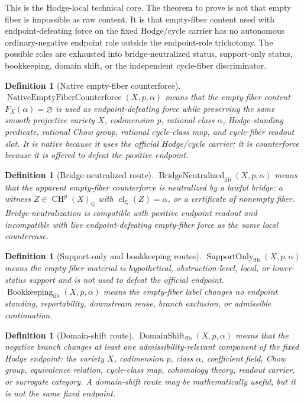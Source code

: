 \documentclass[11pt]{article}
\newtheorem{definition}[theorem]{Definition}
\newcommand{\QQ}{\mathbb{Q}}
\newcommand{\CH}{\operatorname{CH}}
\newcommand{\clQ}{\operatorname{cl}_{\QQ}}
\begin{document}
This is the Hodge-local technical core.  The theorem to prove is not that empty fiber is impossible as raw content.  It is that empty-fiber content used with endpoint-defeating force on the fixed Hodge/cycle carrier has no autonomous ordinary-negative endpoint role outside the endpoint-role trichotomy.  The possible roles are exhausted into bridge-neutralized status, support-only status, bookkeeping, domain shift, or the independent cycle-fiber discriminator.

\begin{definition}[Native empty-fiber counterforce]
$\operatorname{NativeEmptyFiberCounterforce}(X,p,\alpha)$ means that the empty-fiber content $F_X(\alpha)=\varnothing$ is used as endpoint-defeating force while preserving the same smooth projective variety $X$, codimension $p$, rational class $\alpha$, Hodge-standing predicate, rational Chow group, rational cycle-class map, and cycle-fiber readout slot.  It is native because it uses the official Hodge/cycle carrier; it is counterforce because it is offered to defeat the positive endpoint.
\end{definition}

\begin{definition}[Bridge-neutralized route]
$\operatorname{BridgeNeutralized}_{\mathrm{fib}}(X,p,\alpha)$ means that the apparent empty-fiber counterforce is neutralized by a lawful bridge: a witness $Z\in\CH^p(X)_\QQ$ with $\clQ(Z)=\alpha$, or a certificate of nonempty fiber.  Bridge-neutralization is compatible with positive endpoint readout and incompatible with live endpoint-defeating empty-fiber force as the same local countercase.
\end{definition}

\begin{definition}[Support-only and bookkeeping routes]
$\operatorname{SupportOnly}_{\mathrm{fib}}(X,p,\alpha)$ means the empty-fiber material is hypothetical, obstruction-level, local, or lower-status support and is not used to defeat the official endpoint.  $\operatorname{Bookkeeping}_{\mathrm{fib}}(X,p,\alpha)$ means the empty-fiber label changes no endpoint standing, reportability, downstream reuse, branch exclusion, or admissible continuation.
\end{definition}

\begin{definition}[Domain-shift route]
$\operatorname{DomainShift}_{\mathrm{fib}}(X,p,\alpha)$ means that the negative branch changes at least one admissibility-relevant component of the fixed Hodge endpoint: the variety $X$, codimension $p$, class $\alpha$, coefficient field, Chow group, equivalence relation, cycle-class map, cohomology theory, readout carrier, or surrogate category.  A domain-shift route may be mathematically useful, but it is not the same fixed endpoint.
\end{definition}
\end{document}
